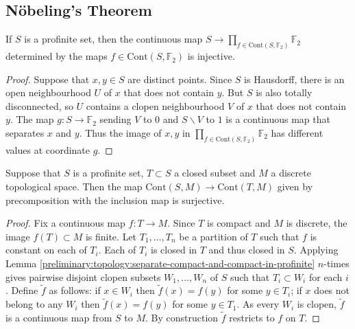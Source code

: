 \subsection{Nöbeling's Theorem}

\begin{lemma}
\label{condensed:profinite:inj-in-prod-f2}
If $ S $ is a profinite set, then the continuous map
$ S\to \prod _{f\in \mathrm{Cont}(S, \mathbb{F}_{2})} \mathbb{F}_{2} $
determined by the maps $ f\in \mathrm{Cont}(S, \mathbb{F}_{2}) $ is injective.
\end{lemma}

\begin{proof}
Suppose that $ x, y\in S $ are distinct points.
Since $ S $ is Hausdorff, there is an open neighbourhood $ U $ of $ x $ that does not contain $ y $.
But $ S $ is also totally disconnected, so $ U $ contains a clopen neighbourhood $ V $ of $ x $ that does not contain $ y $.
The map $ g: S\to \mathbb{F}_{2} $ sending $ V $ to $ 0 $ and $ S\backslash V $ to $ 1 $ is a continuous
map that separates $ x $ and $ y $.
Thus the image of $ x, y $ in $ \prod _{f\in \mathrm{Cont}(S, \mathbb{F}_{2})} \mathbb{F}_{2} $ has different
values at coordinate $ g $.
\end{proof}

\begin{lemma}
\label{condensed:profinite:extend-loc-const-from-closed}
Suppose that $ S $ is a profinite set, $ T\subset S $ a closed subset and $ M $ a discrete topological space.
Then the map $ \mathrm{Cont}(S, M)\to \mathrm{Cont}(T, M) $
given by precomposition with the inclusion map is surjective. 
\end{lemma}

\begin{proof}
Fix a continuous map $ f: T\to M $.
Since $ T $ is compact and $ M $ is discrete, the image $ f (T)\subset M $ is finite.
Let $ T _{1}, \ldots, T _{n} $ be a partition of $ T $ such that $ f $ is constant on each of $ T _{i} $.
Each of $ T _{i} $ is closed in $ T $ and thus closed in $ S $.
Applying Lemma \ref{preliminary:topology:separate-compact-and-compact-in-profinite} $ n $-times
gives pairwise disjoint clopen subsets $ W _{1},\ldots, W _{n} $ of $ S $ such that $ T _{i}\subset W _{i} $ for each $ i $.
Define $ \tilde{f} $ as follows: if $ x\in W _{i} $ then $ \tilde{f}(x) = f (y) $ for some $ y\in T _{i}  $;
if $ x $ does not belong to any $ W _{i} $ then $ \tilde{f}(x) = f (y) $ for some $ y \in T _{1} $.
As every $ W _{i} $ is clopen, $ \tilde{f} $ is a continuous map from $ S $ to $ M $.
By construction $ \tilde{f} $ restricts to $ f $ on $ T $.
\end{proof}


